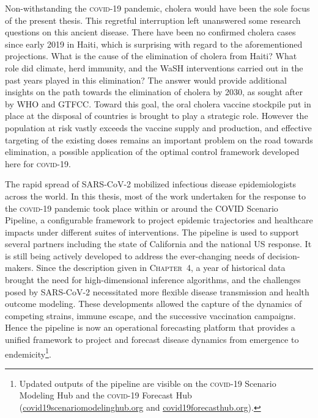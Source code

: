Non-withstanding the \textsc{covid}-19 pandemic, cholera would have been the sole focus of the present thesis. This regretful interruption left unanswered some research questions on this ancient disease. There have been no confirmed cholera cases since early 2019 in Haiti, which is surprising with regard to the aforementioned projections. What is the cause of the elimination of cholera from Haiti? What role did climate, herd immunity, and the WaSH interventions carried out in the past years\cite[-3\baselineskip]{Rebaudet:CaseareaTargetedRapid:2019} played in this elimination? The answer would provide additional insights on the path towards the elimination of cholera by 2030, as sought after by WHO and GTFCC. Toward this goal, the oral cholera vaccine stockpile put in place at the disposal of countries is brought to play a strategic role\cite{GlobalTaskForceonCholeraControl:EndingCholeraGlobal:2017}. However the population at risk vastly exceeds the vaccine supply and production\cite{Pezzoli:GlobalOralCholera:2019}, and effective targeting of the existing doses remains an important problem\cite{Lessler:MappingBurdenCholera:2018} on the road towards elimination, a possible application of the optimal control framework developed here for \textsc{covid}-19. 

The rapid spread of SARS-CoV-2 mobilized infectious disease epidemiologists across the world. In this thesis, most of the work undertaken for the response to the \textsc{covid}-19 pandemic took place within or around the COVID Scenario Pipeline, a configurable framework to project epidemic trajectories and healthcare impacts under different suites of interventions. The pipeline is used to support several partners including the state of California and the national US response. It is still being actively developed to address the ever-changing needs of decision-makers. Since the description given in \textsc{Chapter~4}, a year of historical data brought the need for high-dimensional inference algorithms, and the challenges posed by SARS-CoV-2 necessitated more flexible disease transmission and health outcome modeling. These developments allowed the capture of the dynamics of competing strains, immune escape, and the successive vaccination campaigns\cite{Borchering:ModelingFutureCOVID19:2021}. Hence the pipeline is now an operational forecasting platform that provides a unified framework to project and forecast disease dynamics from emergence to endemicity\footnote{Updated outputs of the pipeline are visible on the \textsc{covid}-19 Scenario Modeling Hub and the \textsc{covid}-19 Forecast Hub (\url{covid19scenariomodelinghub.org} and \url{covid19forecasthub.org}).}.

